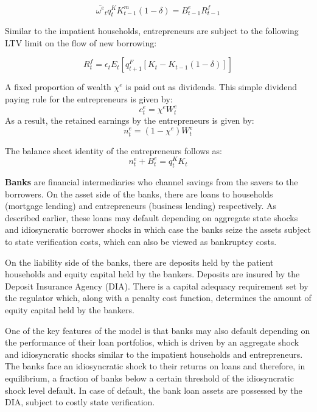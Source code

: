 \documentclass[12pt]{article}
\numberwithin{equation}{section}
\begin{document}
\begin{equation}
\bar{\omega^e}_t q^K_{t} K^m_{t-1}(1-\delta) = B^e_{t-1}R^f_{t-1}
\end{equation}

Similar to the impatient households, entrepreneurs are subject to the following LTV limit on the flow of new borrowing: 

\begin{equation}
[B^e_t-B^e_{t-1}(1-rp)]R^f_{t} =\epsilon_{t} E_t[q^F_{t+1} [K_t-K_{t-1}(1-\delta)]]
\end{equation}


A fixed proportion of wealth $\chi^e$ is paid out as dividends. This simple dividend paying rule for the entrepreneurs is given by:
\begin{equation}
c^e_t=\chi^e W^e_t
\end{equation}
As a result, the retained earnings by the entrepreneurs is given by:
\begin{equation}
n^e_t=(1-\chi^e) W^e_t
\end{equation}

The balance sheet identity of the entrepreneurs follows as:
\begin{equation}
n^e_t+B^e_t=q^K_t K_t
\end{equation}

\noindent
\textbf{Banks } are financial intermediaries who channel savings from the savers to the borrowers. On the asset side of the banks, there are loans to households (mortgage lending) and entrepreneurs (business lending) respectively. As described earlier, these loans may default depending on aggregate state shocks and idiosyncratic borrower shocks in which case the banks seize the assets subject to state verification costs, which can also be viewed as bankruptcy costs. 


On the liability side of the banks, there are deposits held by the patient households and equity capital held by the bankers. Deposits are insured by the Deposit Insurance Agency (DIA). There is a capital adequacy requirement set by the regulator which, along with a penalty cost function, determines the amount of equity capital held by the bankers.

One of the key features of the model  is that banks may also default depending on the performance of their loan portfolios, which is driven by an aggregate shock and idiosyncratic shocks similar to the impatient households and entrepreneurs.
 The banks face an idiosyncratic shock to their returns on loans and therefore, in equilibrium, a fraction of banks below a certain threshold of the idiosyncratic shock level default. In case of default, the bank loan assets are possessed by the DIA, subject to costly state verification. 
\end{document}

